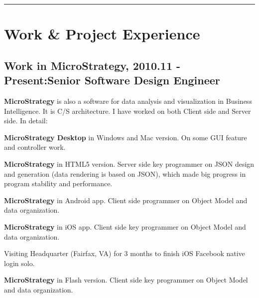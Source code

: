 \documentclass[letterpaper]{article}
\renewenvironment{itemize}{
  \begin{list}{}{
    \setlength{\leftmargin}{1.5em}
    \setlength{\itemsep}{0pt}
  }
}{
  \end{list}
}
\begin{document}

\rule{16.8cm}{0.1em}

\vspace{-1.5em}
\section*{Work \& Project Experience}
\subsection*{Work in MicroStrategy, 2010.11 - Present:\hfill Senior Software Design Engineer}
\begin{itemize}
\item \textbf{MicroStrategy} is also a software for data analysis and visualization in Business Intelligence. It is C/S architecture. I have worked on both Client side and Server side. In detail:
\item \textbf{MicroStrategy Desktop} in Windows and Mac version. On some GUI feature and controller work.
\item \textbf{MicroStrategy} in HTML5 version. Server side key programmer on JSON design and generation (data rendering is based on JSON), which made big progress in program stability and performance.
\item \textbf{MicroStrategy} in Android app. Client side programmer on Object Model and data organization.
\item \textbf{MicroStrategy} in iOS app. Client side key programmer on Object Model and data organization.
\item Visiting Headquarter (Fairfax, VA) for 3 months to finish iOS Facebook native login solo.
\item \textbf{MicroStrategy} in Flash version. Client side key programmer on Object Model and data organization.
\end{itemize}
\end{document}
